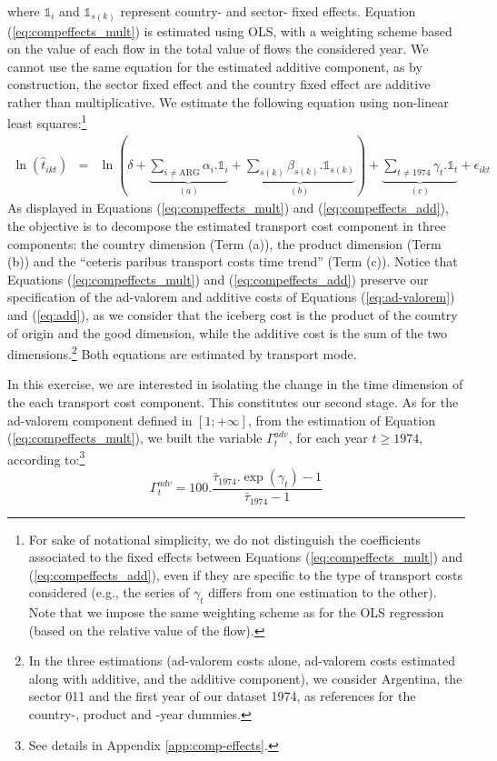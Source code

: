 \documentclass[a4paper,11pt]{article}
\begin{document}
\noindent where $\mathbb{1}_i$ and $\mathbb{1}_{s(k)}$ represent country- and sector- fixed effects. Equation (\ref{eq:compeffects_mult}) is estimated using OLS, with a weighting scheme based on the value of each flow in the total value of flows the considered year. We cannot use the same equation for the estimated additive component, as by construction, the sector fixed effect and the country fixed effect are additive rather than multiplicative. We estimate the following equation using non-linear least squares:\footnote{For sake of notational simplicity, we do not distinguish the coefficients associated to the fixed effects between Equations (\ref{eq:compeffects_mult}) and (\ref{eq:compeffects_add}), even if they are specific to the type of transport costs considered (e.g., the series of $\gamma_t$ differs from one estimation to the other). Note that we impose the same weighting scheme as for the OLS regression (based on the relative value of the flow).}
\begin{eqnarray}
\ln(\widehat{t}_{ikt})&=&\ln\left( \delta + \underbrace{\sum_{i \neq \text{ARG}}  \alpha_i.\mathbb{1}_i}_{(a)}+\underbrace{\sum_{s(k)}\beta_{s(k)}.\mathbb{1}_{s(k)}}_{(b)}\right) + \underbrace{\sum_{t \neq 1974}\gamma_t.\mathbb{1}_t}_{(c)}+\epsilon_{ikt} \label{eq:compeffects_add}
\end{eqnarray}
As displayed in Equations (\ref{eq:compeffects_mult}) and (\ref{eq:compeffects_add}), the objective is to decompose the estimated transport cost component in three components: the country dimension (Term (a)), the product dimension (Term (b)) and the ``ceteris paribus transport costs time trend'' (Term (c)). Notice that Equations (\ref{eq:compeffects_mult}) and (\ref{eq:compeffects_add}) preserve our specification of the ad-valorem and additive costs of Equations (\ref{eq:ad-valorem}) and (\ref{eq:add}), as we consider that the iceberg cost is the product of the country of origin and the good dimension, while the additive cost is the sum of the two dimensions.\footnote{In the three estimations (ad-valorem costs alone, ad-valorem costs estimated along with additive, and the additive component), we consider Argentina, the sector 011 and the first year of our dataset 1974, as references for the country-, product and -year dummies.} Both equations are estimated by transport mode.

In this exercise, we are interested in isolating the change in the time dimension of the each transport cost component. This constitutes our second stage. As for the ad-valorem component defined in $[1;+\infty]$, from the estimation of Equation (\ref{eq:compeffects_mult}), we built the variable $\Gamma^{adv}_t$, for each year $t\geq 1974$, according to:\footnote{See details in Appendix \ref{app:comp-effects}.}
\begin{equation}
\Gamma^{adv}_t = 100.\frac {\bar{\tau}_{1974}.\exp(\gamma_t)-1} {\bar{\tau}_{1974}-1} \label{eq:comp_effects_adv}
\end{equation}
\end{document}
